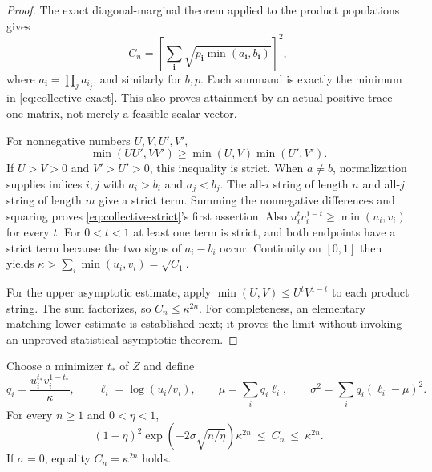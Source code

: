 \begin{proof}
The exact diagonal-marginal theorem applied to the product populations
gives
\[
 C_n=\left[\sum_{\boldsymbol i}
       \sqrt{p_{\boldsymbol i}\min(a_{\boldsymbol i},
                                     b_{\boldsymbol i})}\right]^2,
\]
where $a_{\boldsymbol i}=\prod_j a_{i_j}$, and similarly for $b,p$.
Each summand is exactly the minimum in
\eqref{eq:collective-exact}. This also proves attainment by an actual
positive trace-one matrix, not merely a feasible scalar vector.

For nonnegative numbers $U,V,U',V'$,
\[
 \min(UU',VV')\ge\min(U,V)\min(U',V').
\]
If $U>V>0$ and $V'>U'>0$, this inequality is strict.
When $a\ne b$, normalization supplies indices $i,j$ with $a_i>b_i$
and $a_j<b_j$. The all-$i$ string of length $n$ and all-$j$ string of
length $m$ give a strict term. Summing the nonnegative differences
and squaring proves \eqref{eq:collective-strict}'s first assertion.
Also $u_i^t v_i^{1-t}\ge\min(u_i,v_i)$ for every $t$.
For $0<t<1$ at least one term is strict, and both endpoints have a
strict term because the two signs of $a_i-b_i$ occur. Continuity on
$[0,1]$ then yields $\kappa>\sum_i\min(u_i,v_i)=\sqrt{C_1}$.

For the upper asymptotic estimate, apply
$\min(U,V)\le U^tV^{1-t}$ to each product string. The sum factorizes,
so $C_n\le\kappa^{2n}$. For completeness, an elementary matching
lower estimate is established next; it proves the limit without invoking
an unproved statistical asymptotic theorem.
\end{proof}

\begin{theorem}
\label{thm:finite-copy}
Choose a minimizer $t_*$ of $Z$ and define
\[
 q_i=\frac{u_i^{t_*}v_i^{1-t_*}}{\kappa},\qquad
 \ell_i=\log(u_i/v_i),\qquad
 \mu=\sum_iq_i\ell_i,\qquad
 \sigma^2=\sum_iq_i(\ell_i-\mu)^2.
\]
For every $n\ge1$ and $0<\eta<1$,
\begin{equation}\label{eq:chernoff-sandwich}
 (1-\eta)^2\exp\left(-2\sigma\sqrt{n/\eta}\right)\kappa^{2n}
 \ \le\ C_n\ \le\ \kappa^{2n}.
\end{equation}
If $\sigma=0$, equality $C_n=\kappa^{2n}$ holds.
\end{theorem}

